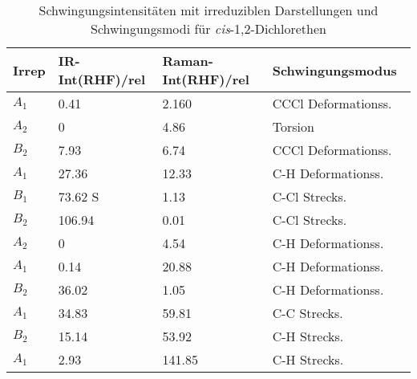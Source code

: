 \documentclass[12pt]{article}
\begin{document}
\begin{onehalfspace}
\begin{table}[!htpb]
\end{table}





\begin{table}[!htpb]

\caption{Schwingungsintensitäten mit irreduziblen Darstellungen und Schwingungsmodi für
\textit{cis}-1,2-Dichlorethen}
\begin{tabular}{llll}
\midrule
Irrep & IR-Int(RHF)/rel & Raman-Int(RHF)/rel & Schwingungsmodus~\supercite{cisvib} \\
\midrule
$A _1$ & 0.41 & 2.160   & CCCl Deformationss.\\
$A _2$ & 0 & 4.86       & Torsion\\
$B _2$ & 7.93 & 6.74    &  CCCl Deformationss.\\
$A _1$ & 27.36 & 12.33  & C-H Deformationss.\\
$B _1$ & 73.62 S & 1.13   & C-Cl Strecks.\\
$B _2$ & 106.94 & 0.01  & C-Cl Strecks.\\
$A _2$ & 0 & 4.54       & C-H Deformationss.\\
$A _1$ & 0.14 & 20.88   & C-H Deformationss.\\
$B _2$ & 36.02 & 1.05   & C-H Deformationss.\\
$A _1$ & 34.83 & 59.81  & C-C Strecks.\\
$B _2$ & 15.14 & 53.92  & C-H Strecks.\\
$A _1$ & 2.93 & 141.85  & C-H Strecks.\\
\bottomrule
\end{tabular}
\label{tab:cisschwings}

\end{table}



\begin{table}[!htpb]


\end{table}
\end{onehalfspace}
\end{document}
